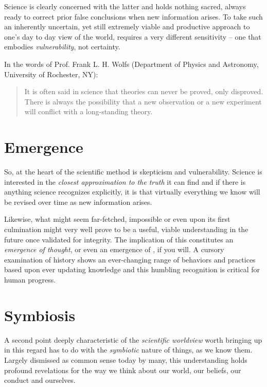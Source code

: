 \documentclass[10pt, a4paper, cleardoubleempty, openright, twoside]{book}
\begin{document}
Science is clearly concerned with the latter and holds nothing sacred,
always ready to correct prior false conclusions when new information
arises. To take such an inherently uncertain, yet still extremely viable
and productive approach to one's day to day view of the world, requires
a very different sensitivity -- one that embodies \emph{vulnerability},
not certainty.

In the words of Prof. Frank L. H. Wolfs (Department of Physics and
Astronomy, University of Rochester, NY): \blockcquote{Wolfs:http:14}{It
is often said in science that theories can never be proved, only
disproved. There is always the possibility that a new observation or a
new experiment will conflict with a long-standing theory.}

\section {Emergence}

So, at the heart of the scientific method is skepticism and
vulnerability. Science is interested in the \emph{closest approximation
to the truth} it can find and if there is anything science recognizes
explicitly, it is that virtually everything we know will be revised over
time as new information arises.

Likewise, what might seem far-fetched, impossible or even
 upon its first culmination might very well
prove to be a useful, viable understanding in the future once validated
for integrity.  The implication of this constitutes an \emph{emergence
	of thought}, or even an emergence of , if you will. A
	cursory examination of history shows an ever-changing range of
	behaviors and practices based upon ever updating knowledge and this
	humbling recognition is critical for human progress.

\section {Symbiosis}

A second point deeply characteristic of the \emph{scientific worldview}
worth bringing up in this regard has to do with the \emph{symbiotic}
nature of things, as we know them. Largely dismissed as common sense
today by many, this understanding holds profound revelations for the way
we think about our world, our beliefs, our conduct and ourselves. 
\end{document}
